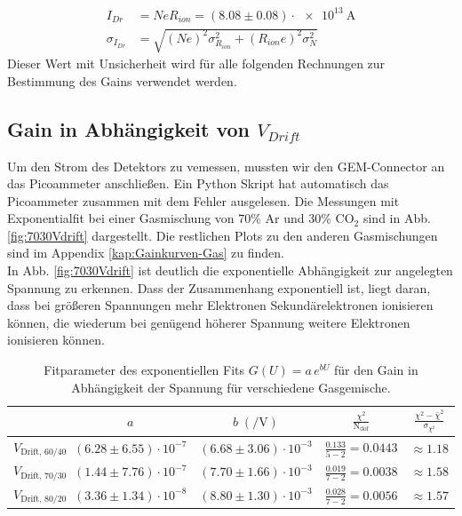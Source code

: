 \begin{equation}
    \boxed{
    \begin{aligned}
        I_{Dr}&=NeR_{ion} = (8.08\pm0.08)\cdot\SI{e13}{\A}\\
        \sigma_{I_{Dr}} &= \sqrt{(Ne)^2\sigma_{R_{ion}}^2+(R_{ion}e)^2\sigma_{N}^2}
        \label{eq:I_dr}
    \end{aligned}
    }
\end{equation}
Dieser Wert mit Unsicherheit wird für alle folgenden Rechnungen zur Bestimmung des Gains verwendet werden.
\newpage
\subsection{Gain in Abhängigkeit von $V_{Drift}$}

Um den Strom des Detektors zu vemessen, mussten wir den GEM-Connector an das Picoammeter anschließen. Ein Python Skript hat automatisch das Picoammeter zusammen mit dem Fehler ausgelesen. Die Messungen mit Exponentialfit bei einer Gasmischung von 70\% Ar und 30\% $\text{CO}_2$ sind in Abb. \ref{fig:7030Vdrift} dargestellt. Die restlichen Plots zu den anderen Gasmischungen sind im Appendix \ref{kap:Gainkurven-Gas} zu finden.\\
In Abb. \ref{fig:7030Vdrift} ist deutlich die exponentielle Abhängigkeit zur angelegten Spannung zu erkennen. Dass der 
Zusammenhang exponentiell ist, liegt daran, dass bei größeren Spannungen mehr Elektronen Sekundärelektronen ionisieren können, die wiederum bei genügend höherer Spannung weitere Elektronen ionisieren können.


\begin{table}[h]
\centering
\begin{tabular}{|l|c|c|c|c|}
    \hline
     & $a$ & $b\;(\si{\per\V})$ & $\frac{\chi^2}{\text{N}_{\text{dof}}} $ & $\frac{\chi^2-\bar\chi^2}{\sigma_{\chi^2}}$\\
    \hline
    $V_{\text{Drift, 60/40}}$ & $(6.28 \pm 6.55)\cdot10^{-7}$ & $(6.68 \pm 3.06)\cdot10^{-3}$ & $\frac{0.133}{5-2}=0.0443$&$\approx1.18$\\
    $V_{\text{Drift, 70/30}}$ & $(1.44 \pm 7.76)\cdot10^{-7}$ & $(7.70 \pm 1.66)\cdot10^{-3}$ & $\frac{0.019}{7-2}=0.0038$&$\approx1.58$\\
    $V_{\text{Drift, 80/20}}$ & $(3.36 \pm 1.34)\cdot10^{-8}$ & $(8.80 \pm 1.30)\cdot10^{-3}$ & $\frac{0.028}{7-2}=0.0056$&$\approx1.57$\\ \hline
\end{tabular}
\caption{Fitparameter des exponentiellen Fits $G(U)=a\,e^{bU}$ für den Gain in Abhängigkeit der Spannung für verschiedene Gasgemische.}
\label{tab:gain_fit_parameter}
\end{table}

